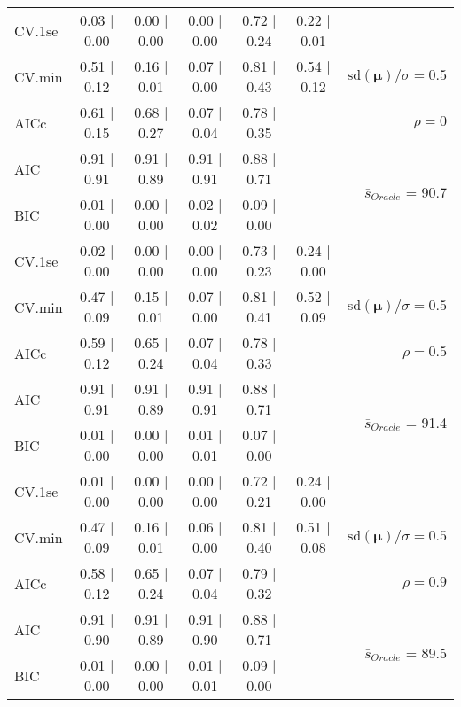\begin{table}
\begin{center}
\begin{tabular}{l*{5}{c}|r}
 \hline 
CV.1se & 0.03 $\mid$ 0.00 & 0.00 $\mid$ 0.00 & 0.00 $\mid$ 0.00 & 0.72 $\mid$ 0.24 & 0.22 $\mid$ 0.01 & \\
CV.min & 0.51 $\mid$ 0.12 & 0.16 $\mid$ 0.01 & 0.07 $\mid$ 0.00 & 0.81 $\mid$ 0.43 & 0.54 $\mid$ 0.12 &  $\mathrm{sd}(\mathbf{\mu})/\sigma=0.5$ \\
AICc & 0.61 $\mid$ 0.15 & 0.68 $\mid$ 0.27 & 0.07 $\mid$ 0.04 & 0.78 $\mid$ 0.35 & & $\rho=0$ \\
AIC & 0.91 $\mid$ 0.91 & 0.91 $\mid$ 0.89 & 0.91 $\mid$ 0.91 & 0.88 $\mid$ 0.71 & &  \multirow{2}{*}{$\bar{s}_{Oracle}$ = 90.7} \\
BIC & 0.01 $\mid$ 0.00 & 0.00 $\mid$ 0.00 & 0.02 $\mid$ 0.02 & 0.09 $\mid$ 0.00 & &  \\
 \hline 
CV.1se & 0.02 $\mid$ 0.00 & 0.00 $\mid$ 0.00 & 0.00 $\mid$ 0.00 & 0.73 $\mid$ 0.23 & 0.24 $\mid$ 0.00 & \\
CV.min & 0.47 $\mid$ 0.09 & 0.15 $\mid$ 0.01 & 0.07 $\mid$ 0.00 & 0.81 $\mid$ 0.41 & 0.52 $\mid$ 0.09 &  $\mathrm{sd}(\mathbf{\mu})/\sigma=0.5$ \\
AICc & 0.59 $\mid$ 0.12 & 0.65 $\mid$ 0.24 & 0.07 $\mid$ 0.04 & 0.78 $\mid$ 0.33 & & $\rho=0.5$ \\
AIC & 0.91 $\mid$ 0.91 & 0.91 $\mid$ 0.89 & 0.91 $\mid$ 0.91 & 0.88 $\mid$ 0.71 & &  \multirow{2}{*}{$\bar{s}_{Oracle}$ = 91.4} \\
BIC & 0.01 $\mid$ 0.00 & 0.00 $\mid$ 0.00 & 0.01 $\mid$ 0.01 & 0.07 $\mid$ 0.00 & &  \\
 \hline 
CV.1se & 0.01 $\mid$ 0.00 & 0.00 $\mid$ 0.00 & 0.00 $\mid$ 0.00 & 0.72 $\mid$ 0.21 & 0.24 $\mid$ 0.00 & \\
CV.min & 0.47 $\mid$ 0.09 & 0.16 $\mid$ 0.01 & 0.06 $\mid$ 0.00 & 0.81 $\mid$ 0.40 & 0.51 $\mid$ 0.08 &  $\mathrm{sd}(\mathbf{\mu})/\sigma=0.5$ \\
AICc & 0.58 $\mid$ 0.12 & 0.65 $\mid$ 0.24 & 0.07 $\mid$ 0.04 & 0.79 $\mid$ 0.32 & & $\rho=0.9$ \\
AIC & 0.91 $\mid$ 0.90 & 0.91 $\mid$ 0.89 & 0.91 $\mid$ 0.90 & 0.88 $\mid$ 0.71 & &  \multirow{2}{*}{$\bar{s}_{Oracle}$ = 89.5} \\
BIC & 0.01 $\mid$ 0.00 & 0.00 $\mid$ 0.00 & 0.01 $\mid$ 0.01 & 0.09 $\mid$ 0.00 & &  \\
 \hline 
\end{tabular}
\end{center}
\vspace{-1cm}
\end{table}




